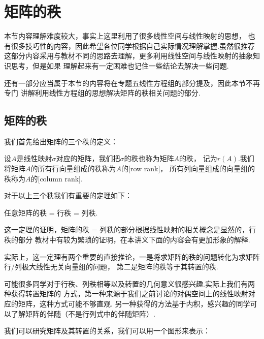 \chapter{矩阵的秩}
本节内容理解难度较大，事实上这里利用了很多线性空间与线性映射的思想，
也有很多技巧性的内容，因此希望各位同学根据自己实际情况理解掌握.虽然很推荐
这部分内容采用与教材不同的思路去理解，更多利用线性空间与线性映射的抽象知识思考，但是如果
理解起来有一定困难也记住一些结论去解决一些问题.

还有一部分应当属于本节的内容将在专题五线性方程组的部分提及，因此本节不再专门
讲解利用线性方程组的思想解决矩阵的秩相关问题的部分.

\section{矩阵的秩}
我们首先给出矩阵的三个秩的定义：
\begin{definition}
    设$A$是线性映射$\sigma$对应的矩阵，我们把$\sigma$的秩也称为矩阵$A$的秩，
    记为$r(A)$.我们将矩阵$A$的所有行向量组成的秩称为$A$的[row rank]，
    所有列向量组成的向量组的秩称为$A$的[column rank].
\end{definition}
对于以上三个秩我们有重要的定理如下：
\begin{theorem}
    任意矩阵的秩 = 行秩 = 列秩.
\end{theorem}
这一定理的证明，矩阵的秩 = 列秩的部分根据线性映射的相关概念是显然的，行秩的部分
教材中有较为繁琐的证明，在本讲义下面的内容会有更加形象的解释.

实际上，这一定理有两个重要的直接推论，一是将求矩阵的秩的问题转化为求矩阵行/列极大线性无关向量组的问题，
第二是矩阵的秩等于其转置的秩.

可能很多同学对于行秩、列秩相等以及转置的几何意义很感兴趣.实际上我们有两种获得转置矩阵的
方式，第一种来源于我们之前讨论的对偶空间上的线性映射对应的矩阵，这种方式可能不够直观.
另一种获得的方法基于内积，感兴趣的同学可以了解矩阵的伴随（不是行列式中的伴随矩阵）.

我们可以研究矩阵及其转置的关系，我们可以用一个图形来表示：


